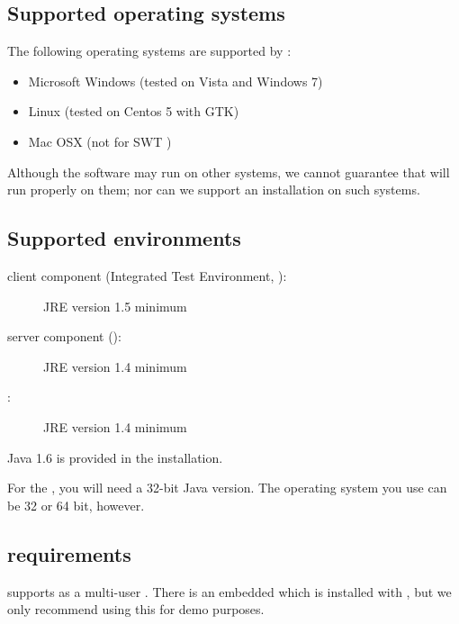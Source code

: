 
\subsection{Supported operating systems}
The following operating systems are supported by \app{}:
\begin{itemize}
  \item Microsoft Windows (tested on Vista and Windows 7)
  \item  Linux (tested on Centos 5 with GTK)
  \item Mac OSX (not for SWT \gdauts{})%

\end{itemize}

Although the software may run on other systems, we cannot guarantee that \app{} will run properly on them; nor can we support an installation on such systems.

\subsection{Supported  environments}
\begin{description}
\item [\app{} client component (Integrated Test Environment, \ite{}):]{JRE version 1.5 minimum}
\item [\app{} server component (\gdagent):]{JRE version 1.4 minimum}
\item [\gdaut{}:]{JRE version 1.4 minimum}
\end{description}
Java 1.6 is provided in the \app{} installation.  

For the \ite{}, you will need a 32-bit Java version. The operating system you use can be 32 or 64 bit, however. 

\subsection{\gdDB requirements}
\app{} supports   as a multi-user \gddb{}. There is an embedded \gddb{} which is installed with \app{}, but we only recommend using this for demo purposes. 


